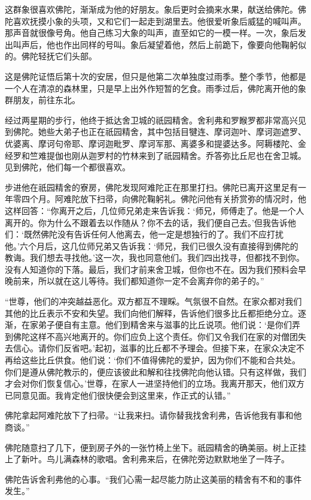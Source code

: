 \documentclass[12pt,twoside,openany]{book}
\begin{document}
这群象很喜欢佛陀，渐渐成为他的好朋友。象后更时会摘来水果，献送给佛陀。佛陀喜欢抚摸小象的头项，又和它们一起走到湖里去。他很爱听象后威猛的喊叫声。那声音就很像号角。他自己练习大象的叫声，直至如它的一模一样。一次，象后发出叫声后，他也作出同样的号叫。象后凝望着他，然后上前跪下，像要向他鞠躬似的。佛陀轻抚它们头部。

这是佛陀证悟后第十次的安居，但只是他第二次单独度过雨季。整个季节，他都是一个人在清凉的森林里，只是早上出外作短暂的乞食。雨季过后，佛陀离开他的象群朋友，前往东北。

经过两星期的步行，他终于抵达舍卫城的祇园精舍。舍利弗和罗睺罗都非常高兴见到佛陀。她些大弟子也正在祇园精舍，其中包括目犍连、摩诃迦叶、摩诃迦遮罗、优婆离、摩诃句帝耶、摩诃迦毗罗、摩诃军那、离婆多和提婆达多。阿耨楼陀、金经罗和竺难提伽也刚从迦罗村的竹林来到了祇园精舍。乔答弥比丘尼也在舍卫城。见到佛陀，他们每一个都很喜欢。

步进他在祇园精舍的寮房，佛陀发现阿难陀正在那里打扫。佛陀已离开这里足有一年零四个月。阿难陀放下扫帚，向佛陀鞠躬礼。佛陀问他有关挢赏弥的情况时，他这样回答：“你离开之后，几位师兄弟走来告诉我：‘师兄，师傅走了。他是一个人离开的。你为什么不跟着去以作随从？你不去的话，我们便自己去。’但我告诉他们：‘既然佛陀没有告诉任何人他离去，他一定是想独行的了。我们不应打扰他。’六个月后，这几位师兄弟又告诉我：‘师兄，我们已很久没有直接得到佛陀的教诲。我们想去寻找他。’这一次，我也同意他们。我们四出找寻，但都找不到你。没有人知道你的下落。最后，我们才前来舍卫城，但你也不在。因为我们预料会早晚前来，所以就在这儿等待。我们都知道你一定不会离弃你的弟子的。”

“世尊，他们的冲突越益恶化。双方都互不理睬。气氛很不自然。在家众都对我们其他的比丘表示不安和失望。我们向他们解释，告诉他们很多比丘都拒绝分立。逐渐，在家弟子便自有主意。他们到精舍来与滋事的比丘说项。他们说：‘是你们弄到佛陀这样不高兴地离开的。你们应负上这个责任。你们又令我们在家的对僧团失去信心。请你们反省吧。’起初，滋事的比丘都不予理会。但接下来，在家众决定不再给这些比丘供食。他们说：‘你们不值得佛陀的爱护，因为你们不能和合共处。你们是遵从佛陀教示的，便应该彼此和解和往找佛陀向他认错。只有这样做，我们才会对你们恢复信心。’世尊，在家人一进坚持他们的立场。我离开那天，他们双方已同意见面。我肯定他们很快便会到这里来，作正式的认错。”

佛陀拿起阿难陀放下了扫帚。“让我来扫。请你替我找舍利弗，告诉他我有事和他商谈。”

佛陀随意扫了几下，便到房子外的一张竹椅上坐下。祇园精舍的确美丽。树上正挂上了新叶。鸟儿满森林的歌唱。舍利弗来后，在佛陀旁边默默地坐了一阵子。

佛陀告诉舍利弗他的心事。“我们心需一起尽能力防止这美丽的精舍有不和的事件发生。”
\end{document}
